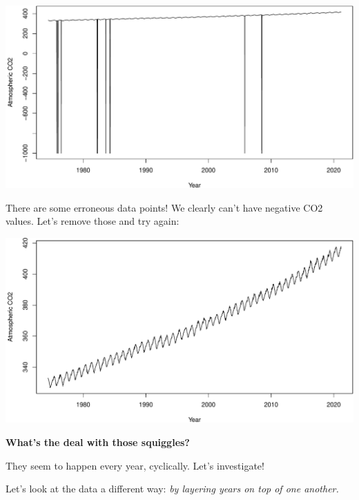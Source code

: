 \documentclass[
]{book}
\newenvironment{Shaded}{\begin{snugshade}}{\end{snugshade}}
\newcommand{\DataTypeTok}[1]{\textcolor[rgb]{0.13,0.29,0.53}{#1}}
\newcommand{\DecValTok}[1]{\textcolor[rgb]{0.00,0.00,0.81}{#1}}
\newcommand{\KeywordTok}[1]{\textcolor[rgb]{0.13,0.29,0.53}{\textbf{#1}}}
\newcommand{\NormalTok}[1]{#1}
\newcommand{\OperatorTok}[1]{\textcolor[rgb]{0.81,0.36,0.00}{\textbf{#1}}}
\newcommand{\StringTok}[1]{\textcolor[rgb]{0.31,0.60,0.02}{#1}}
\begin{document}
\includegraphics{figures/unnamed-chunk-269-1.pdf}

There are some erroneous data points! We clearly can't have negative CO2 values. Let's remove those and try again:

\begin{Shaded}
\end{Shaded}

\includegraphics{figures/unnamed-chunk-270-1.pdf}

\textbf{What's the deal with those squiggles?}

They seem to happen every year, cyclically. Let's investigate!

Let's look at the data a different way: \emph{by layering years on top of one another.}
\end{document}
